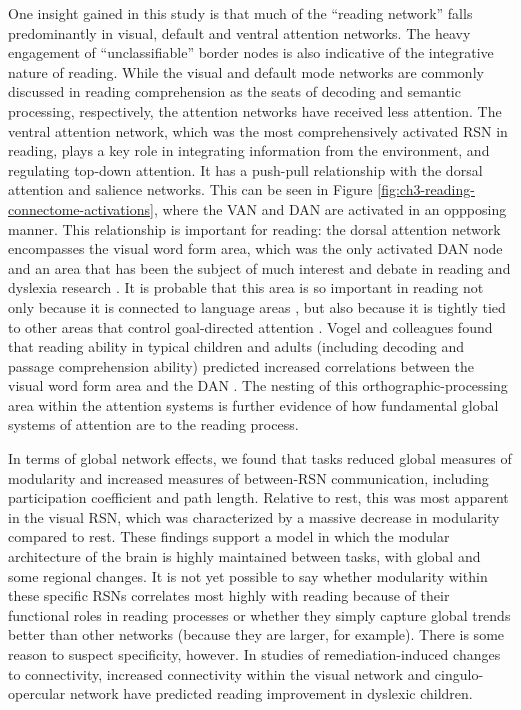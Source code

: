 One insight gained in this study is that much of the ``reading network'' falls predominantly in visual, default and ventral attention networks. The heavy engagement of ``unclassifiable'' border nodes is also indicative of the integrative nature of reading. While the visual and default mode networks are commonly discussed in reading comprehension as the seats of decoding and semantic processing, respectively, the attention networks have received less attention. The ventral attention network, which was the most comprehensively activated RSN in reading, plays a key role in integrating information from the environment, and regulating top-down attention. It has a push-pull relationship with the dorsal attention and salience networks. This can be seen in Figure \ref{fig:ch3-reading-connectome-activations}, where the VAN and DAN are activated in an oppposing manner. This relationship is important for reading: the dorsal attention network encompasses the visual word form area, which was the only activated DAN node and an area that has been the subject of much interest and debate in reading and dyslexia research \citep{McCandliss2003}. It is probable that this area is so important in reading not only because it is connected to language areas \citep{Bouhali2014}, but also because it is tightly tied to other areas that control goal-directed attention \citep{Vogel2014}. Vogel and colleagues found that reading ability in typical children and adults (including decoding and passage comprehension ability) predicted increased correlations between the visual word form area and the DAN \citep{Vogel2012a}. The nesting of this orthographic-processing area within the attention systems is further evidence of how fundamental global systems of attention are to the reading process.

In terms of global network effects, we found that tasks reduced global measures of modularity and increased measures of between-RSN communication, including participation coefficient and path length. Relative to rest, this was most apparent in the visual RSN, which was characterized by a massive decrease in modularity compared to rest. These findings support a model in which the modular architecture of the brain is highly maintained between tasks, with global and some regional changes. It is not yet possible to say whether modularity within these specific RSNs correlates most highly with reading because of their functional roles in reading processes or whether they simply capture global trends better than other networks (because they are larger, for example). There is some reason to suspect specificity, however. In studies of remediation-induced changes to connectivity, increased connectivity within the visual network \citep{Koyama2013} and cingulo-opercular network \citep{HorowitzKraus2015} have predicted reading improvement in dyslexic children.

